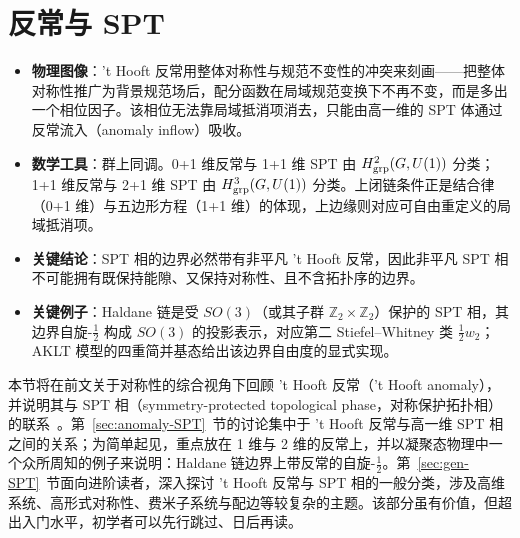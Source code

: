 
\section{反常与 SPT}\label{sec:anomalies}

\begin{keytakeaways}
  \begin{itemize}[leftmargin=1.4em,itemsep=2pt,topsep=2pt]
    \item \textbf{物理图像}：'t Hooft 反常用整体对称性与规范不变性的冲突来刻画——把整体对称性推广为背景规范场后，配分函数在局域规范变换下不再不变，而是多出一个相位因子。该相位无法靠局域抵消项消去，只能由高一维的 SPT 体通过反常流入（anomaly inflow）吸收。
    \item \textbf{数学工具}：群上同调。0+1 维反常与 1+1 维 SPT 由 $H^2_{\rm grp}(G,U(1))$ 分类；1+1 维反常与 2+1 维 SPT 由 $H^3_{\rm grp}(G,U(1))$ 分类。上闭链条件正是结合律（0+1 维）与五边形方程（1+1 维）的体现，上边缘则对应可自由重定义的局域抵消项。
    \item \textbf{关键结论}：SPT 相的边界必然带有非平凡 't Hooft 反常，因此非平凡 SPT 相不可能拥有既保持能隙、又保持对称性、且不含拓扑序的边界。
    \item \textbf{关键例子}：Haldane 链是受 $SO(3)$（或其子群 $\mathbb{Z}_2\times\mathbb{Z}_2$）保护的 SPT 相，其边界自旋-$\frac{1}{2}$ 构成 $SO(3)$ 的投影表示，对应第二 Stiefel--Whitney 类 $\frac{1}{2}w_2$；AKLT 模型的四重简并基态给出该边界自由度的显式实现。
  \end{itemize}
\end{keytakeaways}

本节将在前文关于对称性的综合视角下回顾 't Hooft 反常（'t Hooft anomaly），并说明其与 SPT 相（symmetry-protected topological phase，对称保护拓扑相）的联系~\cite{chen2011two,chen2012chiral,elsenayak2014,kapustin2014anomalous,kapustin2014anomalies,kapustin2014symmetry,thorngren2015higher,wang2015bosonic,chenjie2016,bultinck2018global,wan2018higher,wang2018symmetric,TI4,TI5}。第~\ref{sec:anomaly-SPT}~节的讨论集中于 't Hooft 反常与高一维 SPT 相之间的关系；为简单起见，重点放在 1 维与 2 维的反常上，并以凝聚态物理中一个众所周知的例子来说明：Haldane 链边界上带反常的自旋-$\frac{1}{2}$。第~\ref{sec:gen-SPT}~节面向进阶读者，深入探讨 't Hooft 反常与 SPT 相的一般分类，涉及高维系统、高形式对称性、费米子系统与配边等较复杂的主题。该部分虽有价值，但超出入门水平，初学者可以先行跳过、日后再读。

